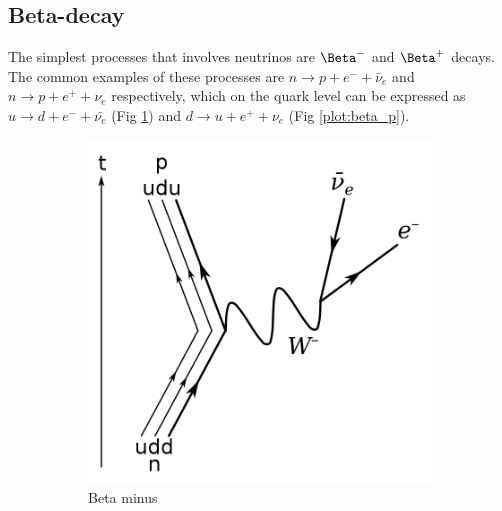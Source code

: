 \subsection{Beta-decay}

The simplest processes that involves neutrinos are $\Beta^{-}$ and  $\Beta^{+}$ decays.
The common examples of these processes are $n \rightarrow p + e^{-}+\bar{\nu}_e$ and $n \rightarrow p + e^{+}+\nu_e$ respectively, which on the quark level can be expressed as $u \rightarrow d + e^{-}+\bar{\nu_e}$ (Fig \ref{plot:beta_m}) and $d \rightarrow u + e^{+}+\nu_e$ (Fig \ref{plot:beta_p}).

\begin{figure}[H]
\centering
\begin{subfigure}[b]{0.35\textwidth}
    \centering
    \includegraphics[width=\linewidth]{figures/chapter6/768px-Beta_Negative_Decay.svg.png}
\caption{Beta minus}
    \label{plot:beta_m}
  \end{subfigure}
\begin{subfigure}[b]{0.35\textwidth}
    \centering

\end{subfigure}
\end{figure}
